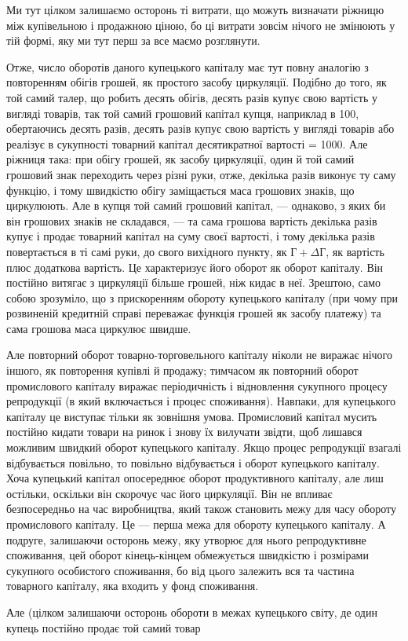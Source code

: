Ми тут цілком залишаємо осторонь ті витрати, що можуть
визначати ріжницю між купівельною і продажною ціною, бо ці
витрати зовсім нічого не змінюють у тій формі, яку ми тут
перш за все маємо розглянути.

Отже, число оборотів даного купецького капіталу має
тут повну аналогію з повторенням обігів грошей, як простого
засобу циркуляції. Подібно до того, як той самий талер, що
робить десять обігів, десять разів купує свою вартість у вигляді
товарів, так той самий грошовий капітал купця, наприклад
в 100, обертаючись десять разів, десять разів купує свою вартість
у вигляді товарів або реалізує в сукупності товарний капітал
десятикратної вартості = 1000. Але ріжниця така: при обігу
грошей, як засобу циркуляції, один й той самий грошовий знак
переходить через різні руки, отже, декілька разів виконує ту
саму функцію, і тому швидкістю обігу заміщається маса грошових
знаків, що циркулюють. Але в купця той самий грошовий
капітал, — однаково, з яких би він грошових знаків не складався, —
та сама грошова вартість декілька разів купує і продає товарний
капітал на суму своєї вартості, і тому декілька разів повертається
в ті самі руки, до свого вихідного пункту, як $Г + ΔГ$,
як вартість плюс додаткова вартість. Це характеризує його
оборот як оборот капіталу. Він постійно витягає з циркуляції
більше грошей, ніж кидає в неї. Зрештою, само собою зрозуміло,
що з прискоренням обороту купецького капіталу (при чому при
розвиненій кредитній справі переважає функція грошей як засобу
платежу) та сама грошова маса циркулює швидше.

Але повторний оборот товарно-торговельного капіталу ніколи
не виражає нічого іншого, як повторення купівлі й продажу;
тимчасом як повторний оборот промислового капіталу виражає
періодичність і відновлення сукупного процесу репродукції (в
який включається і процес споживання). Навпаки, для купецького
капіталу це виступає тільки як зовнішня умова. Промисловий
капітал мусить постійно кидати товари на ринок і знову їх вилучати
звідти, щоб лишався можливим швидкий оборот купецького
капіталу. Якщо процес репродукції взагалі відбувається
повільно, то повільно відбувається і оборот купецького капіталу.
Хоча купецький капітал опосереднює оборот продуктивного
капіталу, але лиш остільки, оскільки він скорочує час його циркуляції.
Він не впливає безпосередньо на час виробництва, який
також становить межу для часу обороту промислового капіталу.
Це — перша межа для обороту купецького капіталу. А подруге,
залишаючи осторонь межу, яку утворює для нього репродуктивне
споживання, цей оборот кінець-кінцем обмежується швидкістю
і розмірами сукупного особистого споживання, бо від цього
залежить вся та частина товарного капіталу, яка входить у фонд
споживання.

Але (цілком залишаючи осторонь обороти в межах купецького
світу, де один купець постійно продає той самий товар
\parbreak{}  %
